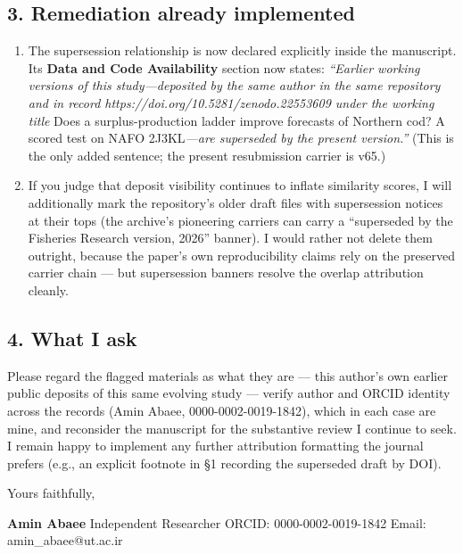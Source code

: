 \documentclass[11pt]{article}
\providecommand{\tightlist}{\setlength{\itemsep}{0.2em}\setlength{\parskip}{0pt}}
\begin{document}
\subsection{3. Remediation already
implemented}\label{remediation-already-implemented}

\begin{enumerate}
\def\labelenumi{\arabic{enumi}.}
\tightlist
\item
  The supersession relationship is now declared explicitly inside the
  manuscript. Its \textbf{Data and Code Availability} section now
  states: \emph{``Earlier working versions of this study---deposited by
  the same author in the same repository and in record
  https://doi.org/10.5281/zenodo.22553609 under the working title} Does
  a surplus-production ladder improve forecasts of Northern cod? A
  scored test on NAFO 2J3KL\emph{---are superseded by the present
  version.''} (This is the only added sentence; the present resubmission
  carrier is v65.)
\item
  If you judge that deposit visibility continues to inflate similarity
  scores, I will additionally mark the repository's older draft files
  with supersession notices at their tops (the archive's pioneering
  carriers can carry a ``superseded by the Fisheries Research version,
  2026'' banner). I would rather not delete them outright, because the
  paper's own reproducibility claims rely on the preserved carrier chain
  --- but supersession banners resolve the overlap attribution cleanly.
\end{enumerate}

\subsection{4. What I ask}\label{what-i-ask}

Please regard the flagged materials as what they are --- this author's
own earlier public deposits of this same evolving study --- verify
author and ORCID identity across the records (Amin Abaee,
0000-0002-0019-1842), which in each case are mine, and reconsider the
manuscript for the substantive review I continue to seek. I remain happy
to implement any further attribution formatting the journal prefers
(e.g., an explicit footnote in §1 recording the superseded draft by
DOI).

Yours faithfully,

\textbf{Amin Abaee} Independent Researcher ORCID: 0000-0002-0019-1842
Email: amin\_abaee@ut.ac.ir
\end{document}
